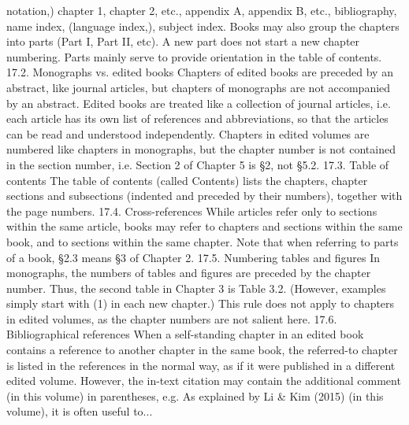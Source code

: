 notation,) chapter 1, chapter 2, etc., appendix A, appendix B, etc., bibliography, name
index, (language index,), subject index.
Books may also group the chapters into parts (Part I, Part II, etc). A new part does not
start a new chapter numbering. Parts mainly serve to provide orientation in the table of
contents.
17.2. Monographs vs. edited books
Chapters of edited books are preceded by an abstract, like journal articles, but chapters of
monographs are not accompanied by an abstract.
Edited books are treated like a collection of journal articles, i.e. each article has its own
list of references and abbreviations, so that the articles can be read and understood
independently.
Chapters in edited volumes are numbered like chapters in monographs, but the chapter
number is not contained in the section number, i.e. Section 2 of Chapter 5 is §2, not §5.2.
17.3. Table of contents
The table of contents (called Contents) lists the chapters, chapter sections and subsections
(indented and preceded by their numbers), together with the page numbers.
17.4. Cross-references
While articles refer only to sections within the same article, books may refer to chapters
and sections within the same book, and to sections within the same chapter. Note that
when referring to parts of a book, §2.3 means §3 of Chapter 2.
17.5. Numbering tables and figures
In monographs, the numbers of tables and figures are preceded by the chapter number.
Thus, the second table in Chapter 3 is Table 3.2. (However, examples simply start with (1)
in each new chapter.)
This rule does not apply to chapters in edited volumes, as the chapter numbers are not
salient here.
17.6. Bibliographical references
When a self-standing chapter in an edited book contains a reference to another chapter in
the same book, the referred-to chapter is listed in the references in the normal way, as if it
were published in a different edited volume. However, the in-text citation may contain the
additional comment (in this volume) in parentheses, e.g.
As explained by Li \& Kim (2015) (in this volume), it is often useful to...
